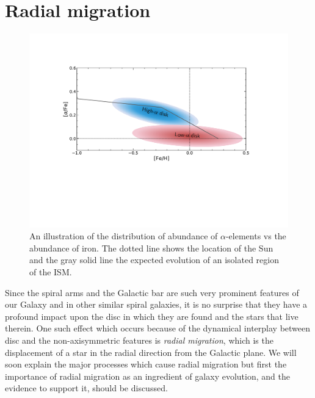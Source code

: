 \section{Radial migration}\label{sec:migration}
\begin{figure}[t]
    \centering
    \includegraphics[width=.9\textwidth]{images/alphaoverfe.pdf}
    \caption{An illustration of the distribution of abundance of $\alpha$-elements vs the abundance of iron. The dotted line shows the location of the Sun and the gray solid line the expected evolution of an isolated region of the ISM.} %
    \label{fig:alphaoverfe}
\end{figure}
Since the spiral arms and the Galactic bar are such very prominent features of our Galaxy and in other similar spiral galaxies, it is no surprise that they have a profound impact upon the disc in which they are found and the stars that live therein. One such effect which occurs because of the dynamical interplay between disc and the non-axisymmetric features is \textit{radial migration}, which is the displacement of a star in the radial direction from the Galactic plane. We will soon explain the major processes which cause radial migration but first the importance of radial migration as an ingredient of galaxy evolution, and the evidence to support it, should be discussed.

